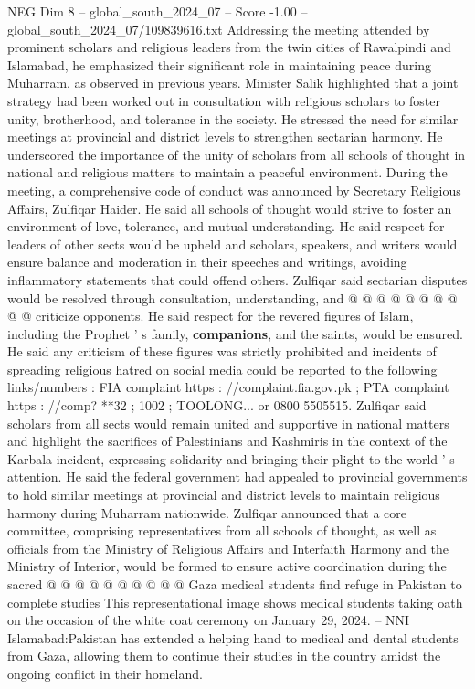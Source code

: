 \begin{textsample}{NEG Dim 8 – global\_south\_2024\_07 – Score -1.00 – global\_south\_2024\_07/109839616.txt}  \label{ex:f8_neg_358}
Addressing the meeting attended by prominent scholars and religious leaders from the twin cities of Rawalpindi and Islamabad, he emphasized their significant role in maintaining peace during Muharram, as observed in previous years.
Minister Salik highlighted that a joint strategy had been worked out in consultation with religious scholars to foster unity, brotherhood, and tolerance in the society.
He stressed the need for similar meetings at provincial and district levels to strengthen sectarian harmony.
He underscored the importance of the unity of scholars from all schools of thought in national and religious matters to maintain a peaceful environment.
During the meeting, a comprehensive code of conduct was announced by Secretary Religious Affairs, Zulfiqar Haider.
He said all schools of thought would strive to foster an environment of love, tolerance, and mutual understanding.
He said respect for leaders of other sects would be upheld and scholars, speakers, and writers would ensure balance and moderation in their speeches and writings, avoiding inflammatory statements that could offend others.
Zulfiqar said sectarian disputes would be resolved through consultation, understanding, and @ @ @ @ @ @ @ @ @ @ criticize opponents.
He said respect for the revered figures of Islam, including the Prophet ' s family, \textbf{companions}, and the saints, would be ensured.
He said any criticism of these figures was strictly prohibited and incidents of spreading religious hatred on social media could be reported to the following links/numbers : FIA complaint https : //complaint.fia.gov.pk ; PTA complaint https : //comp? **32 ; 1002 ; TOOLONG... or 0800 5505515.
Zulfiqar said scholars from all sects would remain united and supportive in national matters and highlight the sacrifices of Palestinians and Kashmiris in the context of the Karbala incident, expressing solidarity and bringing their plight to the world ' s attention.
He said the federal government had appealed to provincial governments to hold similar meetings at provincial and district levels to maintain religious harmony during Muharram nationwide.
Zulfiqar announced that a core committee, comprising representatives from all schools of thought, as well as officials from the Ministry of Religious Affairs and Interfaith Harmony and the Ministry of Interior, would be formed to ensure active coordination during the sacred @ @ @ @ @ @ @ @ @ @ Gaza medical students find refuge in Pakistan to complete studies This representational image shows medical students taking oath on the occasion of the white coat ceremony on January 29, 2024. -- NNI Islamabad:Pakistan has extended a helping hand to medical and dental students from Gaza, allowing them to continue their studies in the country amidst the ongoing conflict in their homeland.

\end{textsample}
